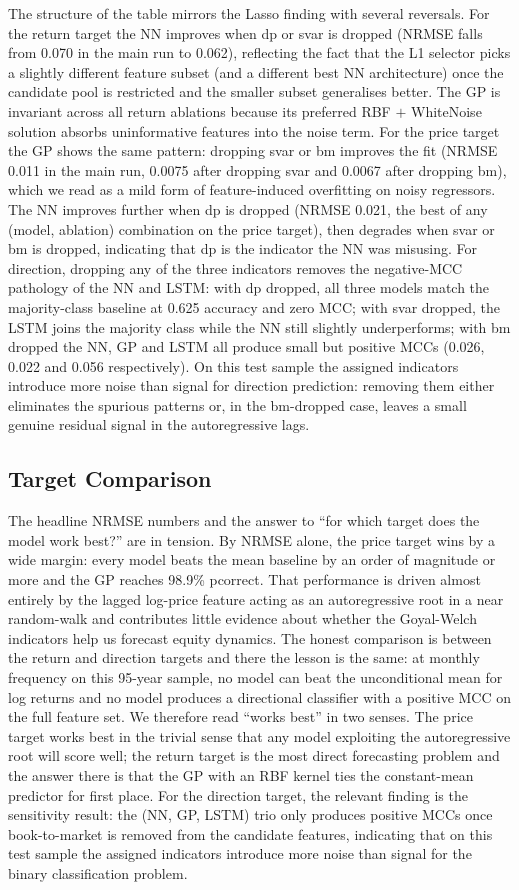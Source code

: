 \documentclass[12pt,a4paper]{article}
\newcommand{\probsub}[2]{\subsection{#2}}
\begin{document}
The structure of the table mirrors the Lasso finding with several reversals. For the return target the NN improves when dp or svar is dropped (NRMSE falls from 0.070 in the main run to 0.062), reflecting the fact that the L1 selector picks a slightly different feature subset (and a different best NN architecture) once the candidate pool is restricted and the smaller subset generalises better. The GP is invariant across all return ablations because its preferred RBF $+$ WhiteNoise solution absorbs uninformative features into the noise term. For the price target the GP shows the same pattern: dropping svar or bm improves the fit (NRMSE 0.011 in the main run, 0.0075 after dropping svar and 0.0067 after dropping bm), which we read as a mild form of feature-induced overfitting on noisy regressors. The NN improves further when dp is dropped (NRMSE 0.021, the best of any (model, ablation) combination on the price target), then degrades when svar or bm is dropped, indicating that dp is the indicator the NN was misusing. For direction, dropping any of the three indicators removes the negative-MCC pathology of the NN and LSTM: with dp dropped, all three models match the majority-class baseline at 0.625 accuracy and zero MCC; with svar dropped, the LSTM joins the majority class while the NN still slightly underperforms; with bm dropped the NN, GP and LSTM all produce small but positive MCCs (0.026, 0.022 and 0.056 respectively). On this test sample the assigned indicators introduce more noise than signal for direction prediction: removing them either eliminates the spurious patterns or, in the bm-dropped case, leaves a small genuine residual signal in the autoregressive lags.

\probsub{2f}{Target Comparison}

The headline NRMSE numbers and the answer to ``for which target does the model work best?'' are in tension. By NRMSE alone, the price target wins by a wide margin: every model beats the mean baseline by an order of magnitude or more and the GP reaches 98.9\% pcorrect. That performance is driven almost entirely by the lagged log-price feature acting as an autoregressive root in a near random-walk and contributes little evidence about whether the Goyal-Welch indicators help us forecast equity dynamics. The honest comparison is between the return and direction targets and there the lesson is the same: at monthly frequency on this 95-year sample, no model can beat the unconditional mean for log returns and no model produces a directional classifier with a positive MCC on the full feature set. We therefore read ``works best'' in two senses. The price target works best in the trivial sense that any model exploiting the autoregressive root will score well; the return target is the most direct forecasting problem and the answer there is that the GP with an RBF kernel ties the constant-mean predictor for first place. For the direction target, the relevant finding is the sensitivity result: the (NN, GP, LSTM) trio only produces positive MCCs once book-to-market is removed from the candidate features, indicating that on this test sample the assigned indicators introduce more noise than signal for the binary classification problem.
\end{document}
